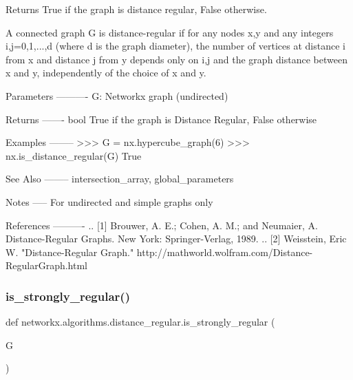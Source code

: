 \begin{DoxyVerb}Returns True if the graph is distance regular, False otherwise.

A connected graph G is distance-regular if for any nodes x,y
and any integers i,j=0,1,...,d (where d is the graph
diameter), the number of vertices at distance i from x and
distance j from y depends only on i,j and the graph distance
between x and y, independently of the choice of x and y.

Parameters
----------
G: Networkx graph (undirected)

Returns
-------
bool
  True if the graph is Distance Regular, False otherwise

Examples
--------
>>> G = nx.hypercube_graph(6)
>>> nx.is_distance_regular(G)
True

See Also
--------
intersection_array, global_parameters

Notes
-----
For undirected and simple graphs only

References
----------
.. [1] Brouwer, A. E.; Cohen, A. M.; and Neumaier, A.
    Distance-Regular Graphs. New York: Springer-Verlag, 1989.
.. [2] Weisstein, Eric W. "Distance-Regular Graph."
    http://mathworld.wolfram.com/Distance-RegularGraph.html\end{DoxyVerb}
 \mbox{\label{namespacenetworkx_1_1algorithms_1_1distance__regular_a7524188ddb265807ef1e71f517dee482}} 
\subsubsection{\texorpdfstring{is\+\_\+strongly\+\_\+regular()}{is\_strongly\_regular()}}
{\footnotesize\ttfamily def networkx.\+algorithms.\+distance\+\_\+regular.\+is\+\_\+strongly\+\_\+regular (\begin{DoxyParamCaption}\item[{}]{G }\end{DoxyParamCaption})}

